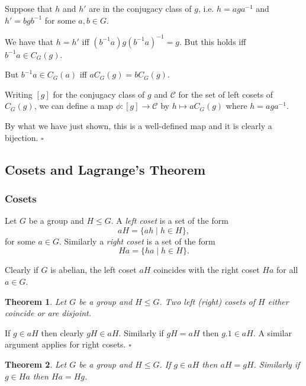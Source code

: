 \documentclass[10pt]{article}
\newtheorem{theorem}{Theorem}[section]
\newenvironment{proof}[1][Proof]{\begin{trivlist}
\item[\hskip \labelsep {\itshape #1}]}{\end{trivlist}}
\newenvironment{definition}[1][Definition]{\begin{trivlist}
\item[\hskip \labelsep {\bfseries #1}]}{\end{trivlist}}
\begin{document}
\begin{proof}
Suppose that $h$ and $h'$ are in the conjugacy class of $g$, i.e. $h = aga^{-1}$ and $h' = bgb^{-1}$ for some $a, b \in G$.

We have that $h = h'$ iff $(b^{-1}a)g(b^{-1}a)^{-1} = g$. But this holds iff $b^{-1}a \in C_G(g)$.

But $b^{-1}a \in C_G(a)$ iff $aC_G(g) = bC_G(g)$.

Writing $[g]$ for the conjugacy class of $g$ and $\mathcal{C}$ for the set of left cosets of $C_G(g)$, we can define a map $\phi : [g] \to \mathcal{C}$ by $h \mapsto aC_G(g)$ where $h = aga^{-1}$.

By what we have just shown, this is a well-defined map and it is clearly a bijection. $\square$
\end{proof}

\subsection{Cosets and Lagrange's Theorem}

\subsubsection{Cosets}

\begin{definition}
Let $G$ be a group and $H \leq G$. A \emph{left coset} is a set of the form
$$aH = \{ah \;|\; h \in H\},$$
for some $a \in G$. Similarly a \emph{right coset} is a set of the form
$$Ha = \{ha \;|\; h \in H\}.$$
\end{definition}

Clearly if $G$ is abelian, the left coset $aH$ coincides with the right coset $Ha$ for all $a \in G$.

\begin{theorem}
Let $G$ be a group and $H \leq G$. Two left (right) cosets of $H$ either coincide or are disjoint.
\end{theorem}

\begin{proof}
If $g \in aH$ then clearly $gH \in aH$. Similarly if $gH = aH$ then $g.1 \in aH$. A similar argument applies for right cosets. $\square$
\end{proof}

\begin{theorem}\label{cosets}
Let $G$ be a group and $H \leq G$. If $g \in aH$ then $aH = gH$. Similarly if $g \in Ha$ then $Ha = Hg$.
\end{theorem}
\end{document}
